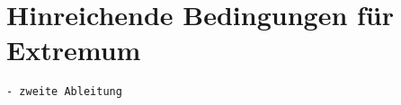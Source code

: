 %
%
%
\section{Hinreichende Bedingungen für Extremum
\label{buch:variation2:section:hinreichend}}

\begin{verbatim}
- zweite Ableitung
\end{verbatim}
